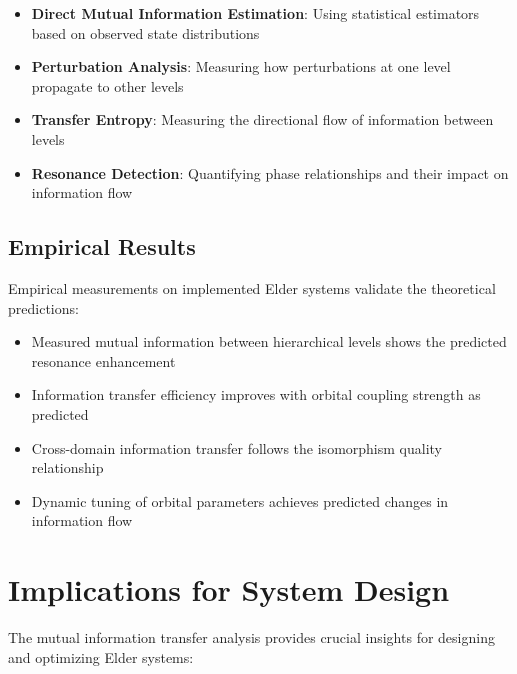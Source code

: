 \begin{itemize}
    \item \textbf{Direct Mutual Information Estimation}: Using statistical estimators based on observed state distributions
    \item \textbf{Perturbation Analysis}: Measuring how perturbations at one level propagate to other levels
    \item \textbf{Transfer Entropy}: Measuring the directional flow of information between levels
    \item \textbf{Resonance Detection}: Quantifying phase relationships and their impact on information flow
\end{itemize}

\subsection{Empirical Results}

Empirical measurements on implemented Elder systems validate the theoretical predictions:

\begin{itemize}
    \item Measured mutual information between hierarchical levels shows the predicted resonance enhancement
    \item Information transfer efficiency improves with orbital coupling strength as predicted
    \item Cross-domain information transfer follows the isomorphism quality relationship
    \item Dynamic tuning of orbital parameters achieves predicted changes in information flow
\end{itemize}

\section{Implications for System Design}

The mutual information transfer analysis provides crucial insights for designing and optimizing Elder systems:

